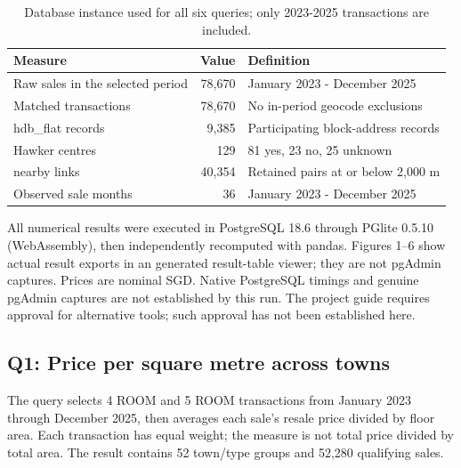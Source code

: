 \documentclass[11pt,a4paper]{article}
\begin{document}

\begin{table}[H]\centering\small
\begin{tabular}{lrl}
\toprule
Measure & Value & Definition \\
\midrule
Raw sales in the selected period & 78,670 & January 2023 - December 2025 \\
Matched transactions & 78,670 & No in-period geocode exclusions \\
hdb\_flat records & 9,385 & Participating block-address records \\
Hawker centres & 129 & 81 yes, 23 no, 25 unknown \\
nearby links & 40,354 & Retained pairs at or below 2,000 m \\
Observed sale months & 36 & January 2023 - December 2025 \\
\bottomrule
\end{tabular}
\caption{Database instance used for all six queries; only 2023-2025 transactions are included.}
\end{table}
\begin{samepage}All numerical results were executed in PostgreSQL 18.6 through PGlite 0.5.10 (WebAssembly), then independently recomputed with pandas. Figures 1--6 show actual result exports in an generated result-table viewer; they are not pgAdmin captures. Prices are nominal SGD. Native PostgreSQL timings and genuine pgAdmin captures are not established by this run. The project guide requires approval for alternative tools; such approval has not been established here.\par\end{samepage}

\subsection{Q1: Price per square metre across towns}
\begin{samepage}The query selects 4 ROOM and 5 ROOM transactions from January 2023 through December 2025, then averages each sale's resale price divided by floor area. Each transaction has equal weight; the measure is not total price divided by total area. The result contains 52 town/type groups and 52,280 qualifying sales.\par\end{samepage}
\end{document}
